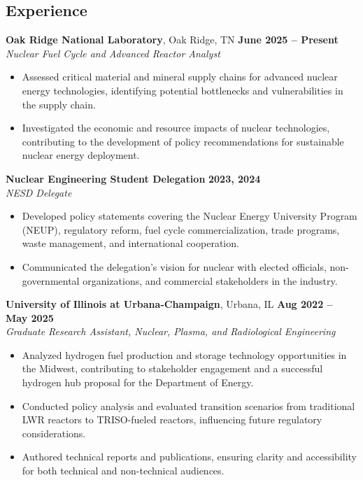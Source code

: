\documentclass[margin,line]{resume}
\begin{document}
\begin{resume}
    \section{\mysidestyle Experience}
    \textbf{Oak Ridge National Laboratory}, Oak Ridge, TN \hfill \textbf{June 2025 -- Present} \\
    \textsl{Nuclear Fuel Cycle and Advanced Reactor Analyst} \\
    \begin{itemize}
        \item Assessed critical material and mineral supply chains for advanced nuclear energy technologies, identifying potential bottlenecks and vulnerabilities in the supply chain.
        \item Investigated the economic and resource impacts of nuclear technologies, contributing to the development of policy recommendations for sustainable nuclear energy deployment.
    \end{itemize}

    \textbf{Nuclear Engineering Student Delegation} \hfill \textbf{2023, 2024} \\
    \textsl{NESD Delegate} \\
    \begin{itemize}
        \item Developed policy statements covering the Nuclear Energy University Program (NEUP), regulatory reform, fuel cycle commercialization, trade programs, waste management, and international cooperation.
        \item Communicated the delegation's vision for nuclear with elected officials, non-governmental organizations, and commercial stakeholders in the industry.
    \end{itemize}

    \textbf{University of Illinois at Urbana-Champaign}, Urbana, IL \hfill \textbf{Aug 2022 -- May 2025} \\
    \textsl{Graduate Research Assistant, Nuclear, Plasma, and Radiological Engineering} \\
    \begin{itemize}
        \item Analyzed hydrogen fuel production and storage technology opportunities in the Midwest, contributing to stakeholder engagement and a successful hydrogen hub proposal for the Department of Energy.
        \item Conducted policy analysis and evaluated transition scenarios from traditional LWR reactors to TRISO-fueled reactors, influencing future regulatory considerations.
        \item Authored technical reports and publications, ensuring clarity and accessibility for both technical and non-technical audiences.
    \end{itemize}


\end{resume}
\end{document}
